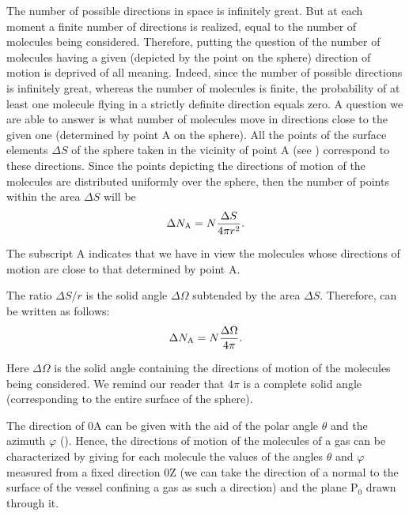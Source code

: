 The number of possible directions in space is infinitely great. But at each moment a finite number of directions is realized, equal to the number of molecules being considered. Therefore, putting the question of the number of molecules having a given (depicted by the point on the sphere) direction of motion is deprived of all meaning. Indeed, since the number of possible directions is infinitely great, whereas the number of molecules is finite, the probability of at least one molecule flying in a strictly definite direction equals zero. A question we are able to answer is what number of molecules move in directions close to the given one (determined by point A on the sphere). All the points of the surface elements $\Delta S$ of the sphere taken in the vicinity of point A (see ) correspond to these directions. Since the points depicting the directions of motion of the molecules are distributed uniformly over the sphere, then the number of points within the area $\Delta S$ will be
\begin{equation}\label{eq:11_12}
	\Delta N_{\text{A}} = N\frac{\Delta S}{4\pi r^2}.
\end{equation}

\noindent
The subscript A indicates that we have in view the molecules whose directions of motion are close to that determined by point A.

The ratio $\Delta S/r$ is the solid angle $\Delta\Omega$ subtended by the area $\Delta S$.  Therefore,  can be written as follows:
\begin{equation}\label{eq:11_13}
	\Delta N_{\text{A}} = N\frac{\Delta\Omega}{4\pi}.
\end{equation}

\noindent
Here $\Delta\Omega$ is the solid angle containing the directions of motion of the molecules being considered. We remind our reader that $4\pi$ is a complete solid angle (corresponding to the entire surface of the sphere).

The direction of $0$A can be given with the aid of the polar angle $\theta$ and the azimuth $\varphi$ (). Hence, the directions of motion of the molecules of a gas can be characterized by giving for each molecule the values of the angles $\theta$ and $\varphi$ measured from a fixed direction $0$Z (we can take the direction of a normal to the surface of the vessel confining a gas as such a direction) and the plane P$_0$ drawn through it.

